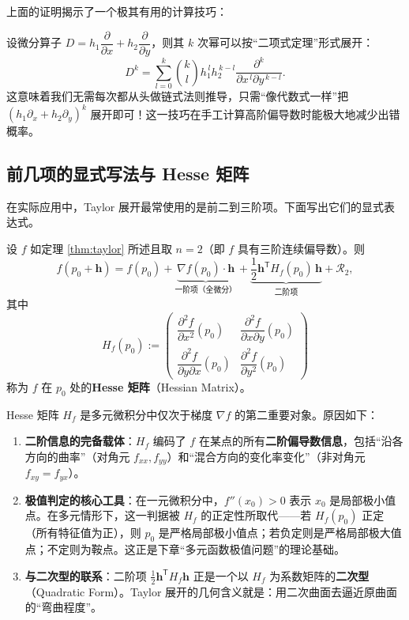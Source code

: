 \documentclass[lang=cn,11pt]{elegantbook}
\begin{document}
\begin{remark}[微分算子幂的二项展开规则] \label{prop:diff-op-power}
上面的证明揭示了一个极其有用的计算技巧：

设微分算子 $D=h_1\dfrac{\partial}{\partial x}+h_2\dfrac{\partial}{\partial y}$，则其 $k$ 次幂可以按“二项式定理”形式展开：
\[
D^k=\sum_{l=0}^{k}\binom{k}{l}h_1^{\,l}h_2^{\,k-l} \frac{\partial^k}{\partial x^{\,l}\partial y^{\,k-l}}.
\]
这意味着我们无需每次都从头做链式法则推导，只需“像代数式一样”把 $(h_1\partial_x+h_2\partial_y)^k$ 展开即可！这一技巧在手工计算高阶偏导数时能极大地减少出错概率。
\end{remark}


\subsection{前几项的显式写法与 Hesse 矩阵}

在实际应用中，Taylor 展开最常使用的是前二到三阶项。下面写出它们的显式表达式。

\begin{property} \label{def:hessian-taylor}
设 $f$ 如定理 \ref{thm:taylor} 所述且取 $n=2$（即 $f$ 具有三阶连续偏导数）。则
\[
f(p_0+\boldsymbol h) = f(p_0) + \underbrace{\nabla f(p_0)\cdot\boldsymbol h}_{\text{一阶项（全微分）}} + \underbrace{\frac{1}{2}\boldsymbol h^{\mathsf T}H_f(p_0)\,\boldsymbol h}_{\text{二阶项}} + \mathcal R_2,
\]
其中
\[
H_f(p_0):=
\begin{pmatrix}
\dfrac{\partial^2 f}{\partial x^2}(p_0) & \dfrac{\partial^2 f}{\partial x\partial y}(p_0)\\[8pt]
\dfrac{\partial^2 f}{\partial y\partial x}(p_0) & \dfrac{\partial^2 f}{\partial y^2}(p_0)
\end{pmatrix}
\]
称为 $f$ 在 $p_0$ 处的\textbf{Hesse 矩阵}（Hessian Matrix）。
\end{property}

\begin{remark} \label{remark:hessian-importance}
Hesse 矩阵 $H_f$ 是多元微积分中仅次于梯度 $\nabla f$ 的第二重要对象。原因如下：
\begin{enumerate}
  \item \textbf{二阶信息的完备载体}：$H_f$ 编码了 $f$ 在某点的所有\textbf{二阶偏导数信息}，包括“沿各方向的曲率”（对角元 $f_{xx},f_{yy}$）和“混合方向的变化率变化”（非对角元 $f_{xy}=f_{yx}$）。
  \item \textbf{极值判定的核心工具}：在一元微积分中，$f''(x_0)>0$ 表示 $x_0$ 是局部极小值点。在多元情形下，这一判据被 $H_f$ 的正定性所取代——若 $H_f(p_0)$ 正定（所有特征值为正），则 $p_0$ 是严格局部极小值点；若负定则是严格局部极大值点；不定则为鞍点。这正是下章“多元函数极值问题”的理论基础。
  \item \textbf{与二次型的联系}：二阶项 $\frac{1}{2}\boldsymbol h^{\mathsf T}H_f\boldsymbol h$ 正是一个以 $H_f$ 为系数矩阵的\textbf{二次型}（Quadratic Form）。Taylor 展开的几何含义就是：用二次曲面去逼近原曲面的“弯曲程度”。
\end{enumerate}
\end{remark}
\end{document}
